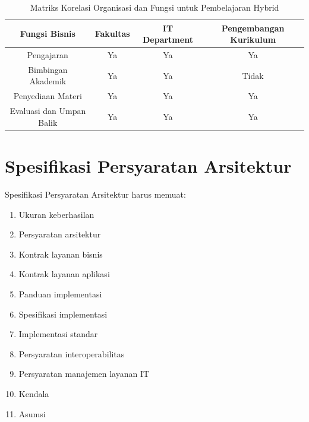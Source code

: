 \begin{table}[h]
	\centering
	\caption{Matriks Korelasi Organisasi dan Fungsi untuk Pembelajaran Hybrid}
	\begin{tabular}{|c|c|c|c|}
		\hline
		\textbf{Fungsi Bisnis} & \textbf{Fakultas} & \textbf{IT Department} & \textbf{Pengembangan Kurikulum} \\ \hline
		Pengajaran            & Ya                  & Ya                      & Ya                         \\ \hline
		Bimbingan Akademik    & Ya                  & Ya                      & Tidak                      \\ \hline
		Penyediaan Materi     & Ya                  & Ya                      & Ya                         \\ \hline
		Evaluasi dan Umpan Balik & Ya              & Ya                      & Ya                         \\ \hline
	\end{tabular}
	\label{tbl:matriks-hybrid}
\end{table}

\section{Spesifikasi Persyaratan Arsitektur}
\label{sec:spesifikasi_persyaratan_arsitektur}
Spesifikasi Persyaratan Arsitektur harus memuat:
\begin{enumerate}
	\item Ukuran keberhasilan
	\item Persyaratan arsitektur
	\item Kontrak layanan bisnis
	\item Kontrak layanan aplikasi
	\item Panduan implementasi
	\item Spesifikasi implementasi
	\item Implementasi standar
	\item Persyaratan interoperabilitas
	\item Persyaratan manajemen layanan IT
	\item Kendala
	\item Asumsi
\end{enumerate}

